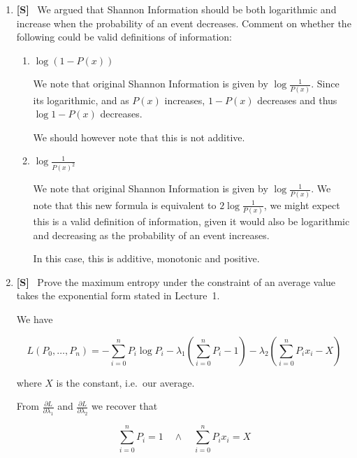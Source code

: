 \documentclass[10pt,\jkfside,a4paper]{article}
\newcommand{\answer}[1]{
    \begin{tcolorbox}[colframe=black, colback=white, sharp corners, boxrule=0.2mm, breakable]
        #1
    \end{tcolorbox}
}
\newcommand{\qtype}[1]{\textbf{[#1]}~}
\begin{document}
\begin{enumerate}
\begin{enumerate}
{            \[
                -\log{2}
            \]
        }
    \end{enumerate}

    \item
    \qtype{S}
    We argued that Shannon Information should be both logarithmic and increase when the probability of an event decreases. Comment on whether the following could be valid definitions of information:
    \begin{enumerate}
        \item
        $\log\left(1 - P(x)\right)$

        \answer{
            We note that original Shannon Information is given by $\log{\frac{1}{P(x)}}$. Since its logarithmic, and as $P(x)$ increases, $1 - P(x)$ decreases and thus $\log{1 - P(x)}$ decreases. 
             
            We should however note that this is not additive. 

        }

        \item
        $\displaystyle \log \frac{1}{P(x)^2}$

        \answer{
            We note that original Shannon Information is given by $\log{\frac{1}{P(x)}}$. We note that this new formula is equivalent to $2 \log \frac{1}{P(x)}$, we might expect this is a valid definition of information, given it would also be logarithmic and decreasing as the probability of an event increases. 

            In this case, this is additive, monotonic and positive. 
        }
    \end{enumerate}

    \item
    \qtype{S}
    Prove the maximum entropy under the constraint of an average value takes the exponential form stated in Lecture~1.

    \answer{
        We have

        \[
            L(P_0, \ldots, P_n) = - \sum_{i=0}^{n} P_i \log{P_i} - \lambda_1 \left( \sum_{i=0}^{n} P_i - 1 \right) - \lambda_2 \left( \sum_{i=0}^{n} P_i x_i - X \right)
        \]

        where $X$ is the constant, i.e.\ our average.

        From $\frac{\partial L}{\partial \lambda_1}$ and $\frac{\partial L}{\partial \lambda_2}$ we recover that

        \[
            \sum_{i=0}^{n} P_i = 1 \quad \wedge \quad \sum_{i=0}^{n} P_i x_i = X
        \]

}
\end{enumerate}
\end{document}
